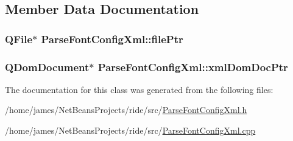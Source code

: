 \subsection{Member Data Documentation}
\hypertarget{class_parse_font_config_xml_a1b42e0d21b2363d136c4f8f3449db672}{
\subsubsection[{file\-Ptr}]{\setlength{\rightskip}{0pt plus 5cm}Q\-File$\ast$ Parse\-Font\-Config\-Xml\-::file\-Ptr\hspace{0.3cm}{\ttfamily [private]}}}\label{class_parse_font_config_xml_a1b42e0d21b2363d136c4f8f3449db672}
\hypertarget{class_parse_font_config_xml_ac1f584710fc22d628bdca0e71308bffe}{
\subsubsection[{xml\-Dom\-Doc\-Ptr}]{\setlength{\rightskip}{0pt plus 5cm}Q\-Dom\-Document$\ast$ Parse\-Font\-Config\-Xml\-::xml\-Dom\-Doc\-Ptr\hspace{0.3cm}{\ttfamily [private]}}}\label{class_parse_font_config_xml_ac1f584710fc22d628bdca0e71308bffe}


The documentation for this class was generated from the following files\-:\begin{DoxyCompactItemize}
\item 
/home/james/\-Net\-Beans\-Projects/ride/src/\hyperlink{_parse_font_config_xml_8h}{Parse\-Font\-Config\-Xml.\-h}\item 
/home/james/\-Net\-Beans\-Projects/ride/src/\hyperlink{_parse_font_config_xml_8cpp}{Parse\-Font\-Config\-Xml.\-cpp}\end{DoxyCompactItemize}
